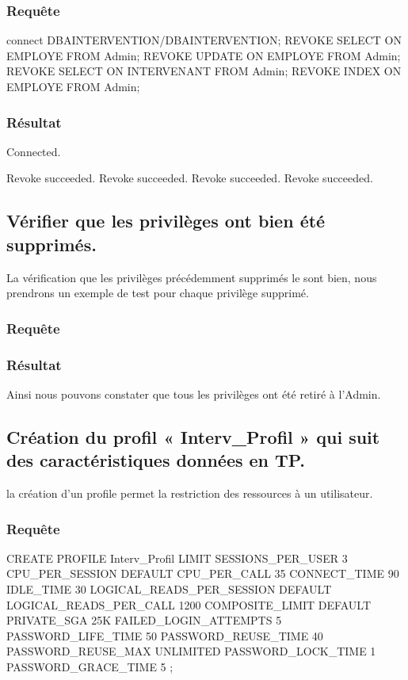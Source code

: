 \documentclass[•]{article}
\begin{document}
\subsubsection{Requête}
\begin{sql}
connect DBAINTERVENTION/DBAINTERVENTION;
	REVOKE SELECT ON EMPLOYE FROM Admin;
	REVOKE UPDATE ON EMPLOYE FROM Admin;
	REVOKE SELECT ON INTERVENANT FROM Admin;
	REVOKE INDEX ON EMPLOYE FROM Admin;
\end{sql}
\subsubsection{Résultat}
\begin{sql}
Connected.

Revoke succeeded.
Revoke succeeded.
Revoke succeeded.
Revoke succeeded.
\end{sql}
   

\subsection{Vérifier que les privilèges ont bien été supprimés.}
\textrm{La vérification que les privilèges précédemment supprimés le sont bien, nous prendrons un exemple de test pour chaque privilège supprimé.}
\subsubsection{Requête}
\begin{sql}

\end{sql}
\subsubsection{Résultat}
\begin{sql}

\end{sql}


\textrm{Ainsi nous pouvons constater que tous les privilèges ont été retiré à l'Admin.}


\subsection{Création du profil « Interv\_Profil » qui suit des caractéristiques données en TP.}

\textrm{la création d'un profile permet la restriction des ressources à un utilisateur.}
\subsubsection{Requête}
\begin{sql}
CREATE PROFILE Interv_Profil
LIMIT SESSIONS_PER_USER 3 
CPU_PER_SESSION DEFAULT 
CPU_PER_CALL 35 CONNECT_TIME 
90 IDLE_TIME 30 
LOGICAL_READS_PER_SESSION DEFAULT 
LOGICAL_READS_PER_CALL 1200 
COMPOSITE_LIMIT DEFAULT
PRIVATE_SGA 25K
FAILED_LOGIN_ATTEMPTS 5
PASSWORD_LIFE_TIME 50
PASSWORD_REUSE_TIME 40
PASSWORD_REUSE_MAX UNLIMITED
PASSWORD_LOCK_TIME 1 
PASSWORD_GRACE_TIME 5 ;
\end{sql}
\end{document}
